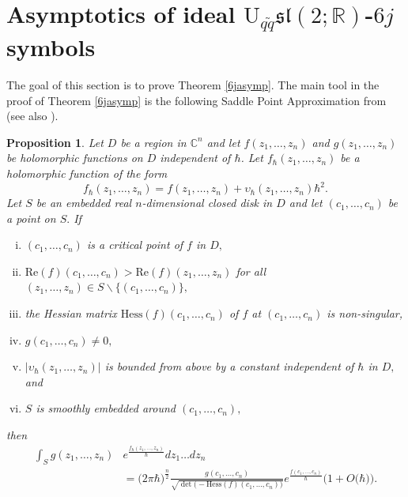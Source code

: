 \documentclass[11pt]{article}
\renewcommand{\setminus}{{\smallsetminus}}
\newtheorem{proposition}[theorem]{Proposition}
\theoremstyle{remark}
\theoremstyle{remark}
\numberwithin{equation}{section}
\begin{document}


\section{Asymptotics  of ideal $\mathrm {U}_{q\tilde q}\mathfrak{sl}(2;\mathbb R)$-$6j$ symbols}

The goal of this section is to prove Theorem \ref{6jasymp}. 
 The main tool in the proof of Theorem \ref{6jasymp} is the following Saddle Point Approximation from \cite[Proposition 6.1]{WY} (see also \cite[Proposition 2.22 and Remark 2.23]{LMSWY}). 

\begin{proposition}\label{saddle}
Let $D$ be a region in $\mathbb C^n$ and let $f(z_1,\dots, z_n)$ and $g(z_1,\dots, z_n)$ be holomorphic functions on $D$ independent of $\hbar$. Let $f_\hbar(z_1,\dots,z_n)$ be a holomorphic function of the form
$$ f_\hbar(z_1,\dots, z_n) = f(z_1,\dots, z_n) + \upsilon_\hbar(z_1,\dots,z_n)\hbar^2.$$
Let $S$ be an embedded real $n$-dimensional closed disk in $D$ and let $(c_1,\dots, c_n)$ be a point on $S.$ If
\begin{enumerate}[(i)]
\item $(c_1, \dots, c_n)$ is a critical point of $f$ in $D,$
\item $\mathrm{Re}(f)(c_1,\dots,c_n) > \mathrm{Re}(f)(z_1,\dots,z_n)$ for all $(z_1,\dots,z_n) \in S\setminus \{(c_1,\dots,c_n)\},$
\item the Hessian matrix $\mathrm{Hess}(f)(c_1,\dots,c_n)$ of $f$ at $(c_1,\dots,c_n)$ is non-singular,
\item $g(c_1,\dots,c_n) \neq 0,$  
\item $|\upsilon_\hbar(z_1,\dots,z_n)|$ is bounded from above by a constant independent of $\hbar$ in $D,$ and
\item $S$ is smoothly embedded around $(c_1,\dots,c_n),$ 
\end{enumerate}
then
\begin{equation*}
\begin{split}
 \int_S g(z_1,\dots, z_n) &e^{\frac{f_\hbar(z_1,\dots,z_n)}{\hbar}} dz_1\dots dz_n\\
 &= \Big(2\pi \hbar\Big)^{\frac{n}{2}}\frac{g(c_1,\dots,c_n)}{\sqrt{\det\big(-\mathrm{Hess}(f)(c_1,\dots,c_n)\big)}} e^{\frac{f(c_1,\dots,c_n)}{\hbar}} \Big( 1 + O \big(\hbar\big)\Big).
 \end{split}
 \end{equation*}
\end{proposition}
\end{document}
